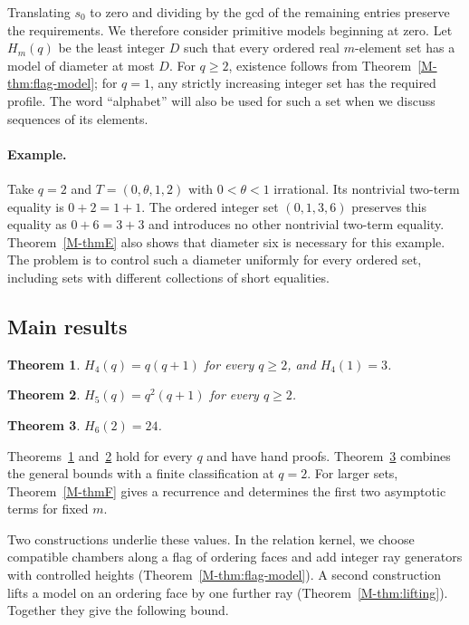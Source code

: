 \documentclass[11pt,reqno]{amsart}
\theoremstyle{plain}
\theoremstyle{definition}
\theoremstyle{plain}
\newtheorem{mainthm}{Theorem}
\theoremstyle{plain}
\theoremstyle{plain}
\theoremstyle{plain}
\theoremstyle{plain}
\theoremstyle{plain}
\theoremstyle{definition}
\theoremstyle{definition}
\theoremstyle{definition}
\theoremstyle{plain}
\begin{document}
Translating $s_0$ to zero and dividing by the gcd of the remaining entries
preserve the requirements. We therefore consider primitive models beginning
at zero. Let $H_m(q)$ be the least integer $D$ such that every ordered real
$m$-element set has a model of diameter at most $D$. For $q\ge2$, existence follows from Theorem~\ref{M-thm:flag-model};
for $q=1$, any strictly increasing integer set has the required profile. The word ``alphabet'' will also be used for such a set when we
discuss sequences of its elements.

\paragraph{Example.}
Take $q=2$ and $T=(0,\theta,1,2)$ with $0<\theta<1$ irrational.
Its nontrivial two-term equality is $0+2=1+1$. The ordered integer set
$(0,1,3,6)$ preserves this equality as $0+6=3+3$ and introduces no other
nontrivial two-term equality. Theorem~\ref{M-thmE} also shows that diameter six is
necessary for this example. The problem is to control such a diameter
uniformly for every ordered set, including sets with different collections
of short equalities.

\subsection{Main results}
\begin{mainthm}\label{M-thmA}
$H_4(q)=q(q+1)$ for every $q\ge2$, and $H_4(1)=3$.
\end{mainthm}

\begin{mainthm}\label{M-thmB}
$H_5(q)=q^2(q+1)$ for every $q\ge2$.
\end{mainthm}

\begin{mainthm}\label{M-thmC}
$H_6(2)=24$.
\end{mainthm}

Theorems~\ref{M-thmA} and~\ref{M-thmB} hold for every $q$ and have hand
proofs. Theorem~\ref{M-thmC} combines the general bounds with a finite
classification at $q=2$. For larger sets, Theorem~\ref{M-thmF} gives a
recurrence and determines the first two asymptotic terms for fixed $m$.

Two constructions underlie these values. In the relation kernel, we
choose compatible chambers along a flag of ordering faces and add integer
ray generators with controlled heights (Theorem~\ref{M-thm:flag-model}).
A second construction lifts a model on an ordering face by one further
ray (Theorem~\ref{M-thm:lifting}). Together they give the following bound.
\end{document}
